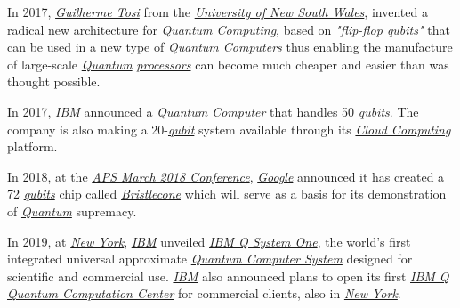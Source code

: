 \documentclass[conference]{IEEEtran}
\begin{document}
\vspace{4pt}

In 2017, \href{https://www.researchgate.net/profile/Guilherme_Tosi}{\textit{Guilherme Tosi}} from the \href{https://en.wikipedia.org/wiki/University_of_New_South_Wales}{\textit{University of New South Wales}}, invented a radical new architecture for \href{https://en.wikipedia.org/wiki/Quantum_computing}{\textit{Quantum Computing}}, based on \href{https://phys.org/news/2017-09-flip-flop-qubits-radical-quantum.html}{\textit{"flip-flop qubits"}} that can be used in a new type of \href{https://en.wikipedia.org/wiki/Quantum_computing}{\textit{Quantum Computers}} thus enabling the manufacture of large-scale \href{https://en.wikipedia.org/wiki/Quantum}{\textit{Quantum}} \href{https://en.wikipedia.org/wiki/Processor_(computing)}{\textit{processors}} can become much cheaper and easier than was thought possible.\cite{b5}

\vspace{4pt}

In 2017, \href{https://en.wikipedia.org/wiki/IBM}{\textit{IBM}} announced a \href{https://en.wikipedia.org/wiki/Quantum_computing}{\textit{Quantum Computer}} that handles 50 \href{https://en.wikipedia.org/wiki/Qubit}{\textit{qubits}}. The company is also making a 20-\href{https://en.wikipedia.org/wiki/Qubit}{\textit{qubit}} system available through its \href{https://en.wikipedia.org/wiki/Cloud_computing}{\textit{Cloud Computing}} platform.

\vspace{4pt}

In 2018, at the \href{https://www.aps.org/meetings/meeting.cfm?name=MAR18}{\textit{APS March 2018 Conference}}, \href{https://en.wikipedia.org/wiki/Google}{\textit{Google}} announced it has created a 72 \href{https://en.wikipedia.org/wiki/Qubit}{\textit{qubits}} chip called \href{https://ai.googleblog.com/2018/03/a-preview-of-bristlecone-googles-new.html}{\textit{Bristlecone}} which will serve as a basis for its demonstration of \href{https://en.wikipedia.org/wiki/Quantum}{\textit{Quantum}} supremacy.

\vspace{4pt}

In 2019, at \href{https://en.wikipedia.org/wiki/New_York_City}{\textit{New York}}, \href{https://en.wikipedia.org/wiki/IBM}{\textit{IBM}} unveiled \href{https://en.wikipedia.org/wiki/IBM_Q_System_One}{\textit{IBM Q System One\texttrademark}}, the world's first integrated universal approximate \href{https://en.wikipedia.org/wiki/Quantum_computing}{\textit{Quantum Computer System}} designed for scientific and commercial use. \href{https://en.wikipedia.org/wiki/IBM}{\textit{IBM}} also announced plans to open its first \href{https://www.research.ibm.com/ibm-q/}{\textit{IBM Q Quantum Computation Center}} for commercial clients, also in \href{https://en.wikipedia.org/wiki/New_York_City}{\textit{New York}}.
\end{document}
